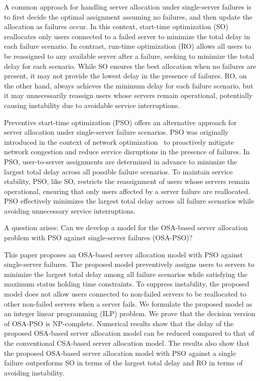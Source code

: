 \documentclass[conference]{IEEEtran}
\begin{document}
\begin{CJK}{UTF8}{ipxm}
A common approach for handling server allocation under single-server failures is to first decide the optimal assignment assuming no failures, and then update the allocation as failures occur. 
In this context, start-time optimization (SO) reallocates only users connected to a failed server to minimize the total delay in each failure scenario. 
In contrast, run-time optimization (RO) allows all users to be reassigned to any available server after a failure, seeking to minimize the total delay for each scenario. 
While SO ensures the best allocation when no failures are present, it may not provide the lowest delay in the presence of failures. 
RO, on the other hand, always achieves the minimum delay for each failure scenario, but it may unnecessarily reassign users whose servers remain operational, potentially causing instability due to avoidable service interruptions.

Preventive start-time optimization (PSO) offers an alternative approach for server allocation under single-server failure scenarios. 
PSO was originally introduced in the context of network optimization~\cite{5_9_13_Kamrul2010,OkiDRCN2014} to proactively mitigate network congestion and reduce service disruptions in the presence of failures. 
In PSO, user-to-server assignments are determined in advance to minimize the largest total delay across all possible failure scenarios. 
To maintain service stability, PSO, like SO, restricts the reassignment of users whose servers remain operational, ensuring that only users affected by a server failure are reallocated. 
PSO effectively minimizes the largest total delay across all failure scenarios while avoiding unnecessary service interruptions.

A question arises: 
Can we develop a model for the OSA-based server allocation problem with PSO against single-server failures (OSA-PSO)?

This paper proposes an OSA-based server allocation model with PSO against single-server failures.
The proposed model preventively assigns users to servers to minimize the largest total delay among all failure scenarios while satisfying the maximum status holding time constraints.
To suppress instability, the proposed model does not allow users connected to non-failed servers to be reallocated to other non-failed servers when a server fails.
We formulate the proposed model as an integer linear programming (ILP) problem.
We prove that the decision version of OSA-PSO is NP-complete.
Numerical results show that the delay of the proposed OSA-based server allocation model can be reduced compared to that of the conventional CSA-based server allocation model.
The results also show that the proposed OSA-based server allocation model with PSO against a single failure outperforms SO in terms of the largest total delay and RO in terms of avoiding instability.


\end{CJK}
\end{document}
